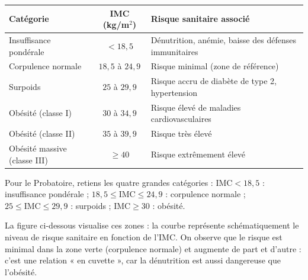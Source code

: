 \documentclass[11pt]{article}
\newcommand{\cle}[1]{{\popxbold\color{popdark}#1}}
\begin{document}
\begin{center}
\begin{tabularx}{\linewidth}{|l|c|X|}
\hline
\rowcolor{popblueL} \textbf{Catégorie} & \textbf{IMC (kg/m$^{2}$)} & \textbf{Risque sanitaire associé} \\
\hline
Insuffisance pondérale & $< 18,5$ & Dénutrition, anémie, baisse des défenses immunitaires \\
\hline
Corpulence normale & $18,5$ à $24,9$ & Risque minimal (zone de référence) \\
\hline
Surpoids & $25$ à $29,9$ & Risque accru de diabète de type 2, hypertension \\
\hline
Obésité (classe I) & $30$ à $34,9$ & Risque élevé de maladies cardiovasculaires \\
\hline
Obésité (classe II) & $35$ à $39,9$ & Risque très élevé \\
\hline
Obésité massive (classe III) & $\geq 40$ & Risque extrêmement élevé \\
\hline
\end{tabularx}
\end{center}

\begin{aretenir}
Pour le Probatoire, retiens les quatre grandes catégories : $\mathrm{IMC} < 18,5$ : \cle{insuffisance pondérale} ; $18,5 \leq \mathrm{IMC} \leq 24,9$ : \cle{corpulence normale} ; $25 \leq \mathrm{IMC} \leq 29,9$ : \cle{surpoids} ; $\mathrm{IMC} \geq 30$ : \cle{obésité}.
\end{aretenir}

La figure ci-dessous visualise ces zones : la courbe représente schématiquement le niveau de risque sanitaire en fonction de l'IMC. On observe que le risque est minimal dans la zone verte (corpulence normale) et augmente de part et d'autre : c'est une relation « en cuvette », car la dénutrition est aussi dangereuse que l'obésité.
\end{document}
